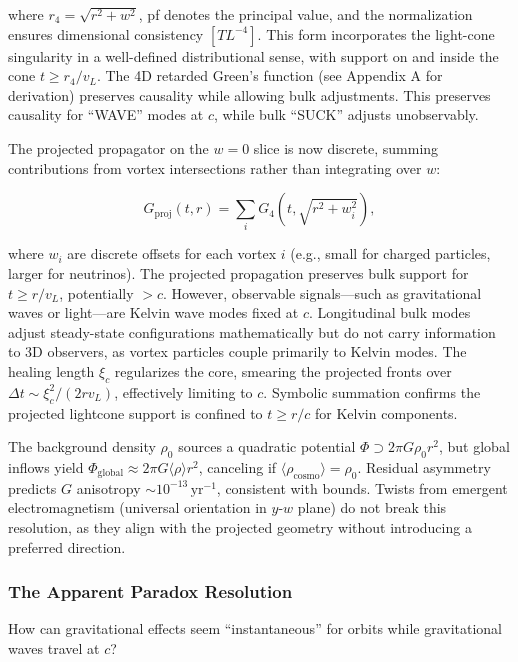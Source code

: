 where $r_4 = \sqrt{r^2 + w^2}$, pf denotes the principal value, and the normalization ensures dimensional consistency $[T L^{-4}]$. This form incorporates the light-cone singularity in a well-defined distributional sense, with support on and inside the cone $t \geq r_4 / v_L$. The 4D retarded Green's function (see Appendix A for derivation) preserves causality while allowing bulk adjustments. This preserves causality for ``WAVE'' modes at $c$, while bulk ``SUCK'' adjusts unobservably.

The projected propagator on the $w=0$ slice is now discrete, summing contributions from vortex intersections rather than integrating over $w$:

\begin{equation}
G_{\text{proj}}(t, r) = \sum_i G_4(t, \sqrt{r^2 + w_i^2}),
\end{equation}

where $w_i$ are discrete offsets for each vortex $i$ (e.g., small for charged particles, larger for neutrinos). The projected propagation preserves bulk support for $t \geq r / v_L$, potentially $>c$. However, observable signals---such as gravitational waves or light---are Kelvin wave modes fixed at $c$. Longitudinal bulk modes adjust steady-state configurations mathematically but do not carry information to 3D observers, as vortex particles couple primarily to Kelvin modes. The healing length $\xi_c$ regularizes the core, smearing the projected fronts over $\Delta t \sim \xi_c^2 / (2 r v_L)$, effectively limiting to $c$. Symbolic summation confirms the projected lightcone support is confined to $t \geq r / c$ for Kelvin components.

The background density $\rho_0$ sources a quadratic potential $\Phi \supset 2\pi G \rho_0 r^2$, but global inflows yield $\Phi_{\text{global}} \approx 2\pi G \langle \rho \rangle r^2$, canceling if $\langle \rho_{\text{cosmo}} \rangle = \rho_0$. Residual asymmetry predicts $G$ anisotropy $\sim 10^{-13} \,\mathrm{yr}^{-1}$, consistent with bounds. Twists from emergent electromagnetism (universal orientation in $y$-$w$ plane) do not break this resolution, as they align with the projected geometry without introducing a preferred direction.

\subsubsection{The Apparent Paradox Resolution}

How can gravitational effects seem ``instantaneous'' for orbits while gravitational waves travel at $c$?

